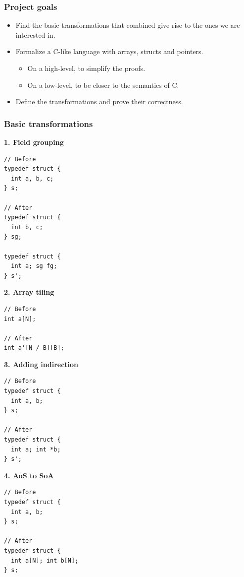 \begin{frame}[fragile]
\frametitle{Project goals}

\begin{itemize}
	\setlength\itemsep{1.5em}
	\item Find the basic transformations that combined give rise to the ones we are interested in.\\
	\item Formalize a C-like language with arrays, structs and pointers.
	\begin{itemize}
		\item On a high-level, to simplify the proofs.
		\item On a low-level, to be closer to the semantics of C.
	\end{itemize}
	\item Define the transformations and prove their correctness.
\end{itemize}

\end{frame}


\begin{frame}[fragile]
\frametitle{Basic transformations}

\begin{center}
\begin{minipage}{0.45\linewidth}
\textbf{\small 1. Field grouping}
\begin{lstlisting}[style=Cstyle, basicstyle=\scriptsize]
// Before
typedef struct {
  int a, b, c;
} s;

// After
typedef struct {
  int b, c;
} sg;

typedef struct {
  int a; sg fg;
} s';
\end{lstlisting}
\textbf{\small 2. Array tiling}
\begin{lstlisting}[style=Cstyle, basicstyle=\scriptsize]
// Before
int a[N];

// After
int a'[N / B][B];
\end{lstlisting}
\end{minipage}%
\begin{minipage}{0.45\linewidth}
\textbf{\small 3. Adding indirection}
\begin{lstlisting}[style=Cstyle, basicstyle=\scriptsize]
// Before
typedef struct {
  int a, b;
} s;

// After
typedef struct {
  int a; int *b;
} s';
\end{lstlisting}
\textbf{\small 4. AoS to SoA}
\begin{lstlisting}[style=Cstyle, basicstyle=\scriptsize]
// Before
typedef struct {
  int a, b;
} s;

// After
typedef struct {
  int a[N]; int b[N];
} s;
\end{lstlisting}
\end{minipage}
\end{center}

\end{frame}


